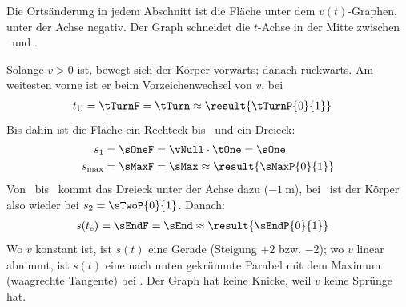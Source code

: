 Die Ortsänderung in jedem Abschnitt ist die Fläche unter dem $v(t)$-Graphen, unter der Achse negativ. Der Graph schneidet die $t$-Achse in der Mitte zwischen \tOneO\ und \tTwoO.
\begin{abcliste}
\abc Solange $v>0$ ist, bewegt sich der Körper vorwärts; danach rückwärts. Am weitesten vorne ist er beim Vorzeichenwechsel von $v$, bei
\begin{align}
 t_\mathrm{U} &= \tTurnF = \tTurn \approx \result{\tTurnP{0}{1}}
\end{align}
Bis dahin ist die Fläche ein Rechteck bis \tOneO\ und ein Dreieck:
\begin{align}
 s_1 &= \sOneF = \vNull\cdot\tOne = \sOne \\
 s_\mathrm{max} &= \sMaxF = \sMax \approx \result{\sMaxP{0}{1}}
\end{align}
\abc Von \ bis \tTwoO\ kommt das Dreieck unter der Achse dazu ($-\SI{1}{\meter}$), bei \tTwoO\ ist der Körper also wieder bei $s_2 = \sTwoP{0}{1}$. Danach:
\begin{align}
 s(t_\mathrm{e}) &= \sEndF = \sEnd \approx \result{\sEndP{0}{1}}
\end{align}
Wo $v$ konstant ist, ist $s(t)$ eine Gerade (Steigung $+2$ bzw. $-2$); wo $v$ linear abnimmt, ist $s(t)$ eine nach unten gekrümmte Parabel mit dem Maximum (waagrechte Tangente) bei . Der Graph hat keine Knicke, weil $v$ keine Sprünge hat.
\begin{center}
\end{center}
\end{abcliste}
